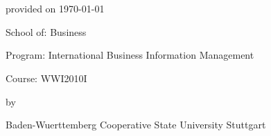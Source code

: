 \begin{titlepage}
\begin{center}
\vspace{3mm}

\textbf{\textsc{\Large 	\papertitle}} \\
\vspace{1.5cm}

\papertype \\ %
\vspace{0.4cm}

provided on \today \\ %
\vspace{0.4cm}

School of: Business  \\
\vspace{0.4cm}

Program: International Business Information Management \\ %
\vspace{0.4cm}

Course: WWI2010I \\ %
\vspace{1.5cm}

by \\
\paperauthor %
\vspace{1cm}
							
Baden-Wuerttemberg Cooperative State University Stuttgart	\\




\end{center}
\vspace*{\fill}
\end{titlepage}